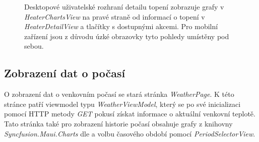 \begin{figure}[hbt]
\centering
{}
\caption{Desktopové uživatelské rozhraní detailu topení zobrazuje grafy v {\it HeaterChartsView} na pravé straně od informací o topení v {\it HeaterDetailView} a tlačítky s dostupnými akcemi. Pro mobilní zařízení jsou z důvodu úzké obrazovky tyto pohledy umístěny pod sebou.}
\end{figure}

\subsection{Zobrazení dat o počasí}
O zobrazení dat o venkovním počasí se stará stránka {\it WeatherPage}. K této stránce patří viewmodel typu {\it WeatherViewModel}, který se po své inicializaci pomocí HTTP metody {\it GET} pokusí získat informace o aktuální venkovní teplotě. Tato stránka také pro zobrazení historie počasí obsahuje grafy z knihovny {\it Syncfusion.Maui.Charts} dle \cite{maui-charts} a volbu časového období pomocí {\it PeriodSelectorView}.

